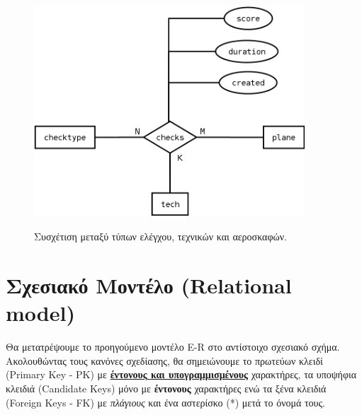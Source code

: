 \documentclass[a4paper]{article}
\begin{document}
\begin{figure}[h]
\centering
\includegraphics[width=0.9\textwidth]{../../ER_model/aviation_relations_2.png}\\
\caption{Συσχέτιση μεταξύ τύπων ελέγχου, τεχνικών και αεροσκαφών.}
\end{figure}
\pagebreak

\section{Σχεσιακό Μοντέλο  (Relational model)}
Θα μετατρέψουμε το προηγούμενο μοντέλο E-R στο αντίστοιχο σχεσιακό σχήμα.
Ακολουθώντας τους κανόνες σχεδίασης, θα σημειώνουμε το πρωτεύων κλειδί
(Primary Key - PK) με  \underline{\textbf{έντονους και υπογραμμισμένους}} χαρακτήρες,
τα υποψήφια κλειδιά (Candidate Keys) μόνο με \textbf{έντονους}
χαρακτήρες ενώ τα ξένα κλειδιά (Foreign Keys - FK) με \textit{πλάγιους} και ένα αστερίσκο (*) μετά
το όνομά τους.\\
\end{document}
